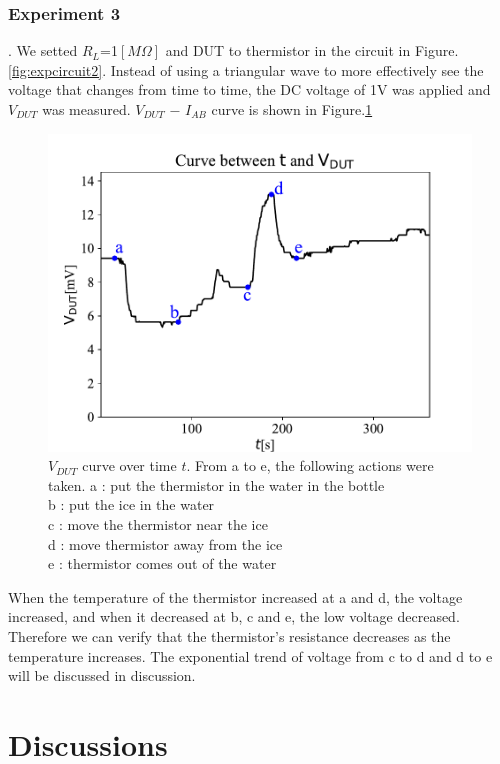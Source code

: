 \documentclass[5p,sort&compress]{elsarticle}
\begin{document}
\subsubsection{Experiment 3}.
\newline{}
We setted $R_L$=1$[M\Omega]$ and DUT to thermistor in the circuit in Figure.\ref{fig:expcircuit2}. Instead of using a triangular wave to more effectively see the voltage that changes from time to time, the DC voltage of 1V was applied and $V_{DUT}$ was measured. $V_{DUT}$ $-$ $I_{AB}$ curve is shown in Figure.\ref{fig:cooling_VT}
\begin{figure}[h]
\centering
\includegraphics[width=.5\textwidth]{ICE_coolign_Vt.pdf}
\caption{ 
$V_{DUT}$ curve over time $t$. From a to e, the following actions were taken.
a : put the thermistor in the water in the bottle\\
b : put the ice in the water\\
c : move the thermistor near the ice\\
d : move thermistor away from the ice\\
e : thermistor comes out of the water
}
\label{fig:cooling_VT}
\end{figure}
When the temperature of the thermistor increased at a and d, the voltage increased, and when it decreased at b, c and e, the low voltage decreased. Therefore we can verify that the thermistor's resistance decreases as the temperature increases. 
The exponential trend of voltage from c to d and d to e will be discussed in discussion.



\section{Discussions}
\end{document}
